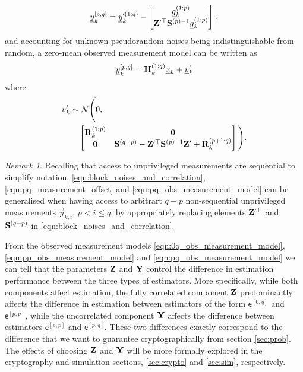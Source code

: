 \documentclass[conference]{IEEEtran}
\theoremstyle{definition}
\theoremstyle{remark}
\newtheorem*{remark}{Remark}
\begin{document}
\begin{LaTeXdescription}
  \begin{equation}\label{eqn:pq_measurement_offset}
    \vec{y}_k^{[p,q]}=\vec{y}_k^{\prime(1:q)} - 
    \begin{bmatrix}
      \vec{g}_k^{(1:p)}\\
      \mat{Z}^{\prime\top}\mat{S}^{(p)-1}\vec{g}_k^{(1:p)}
    \end{bmatrix}\,,
  \end{equation}
  and accounting for unknown pseudorandom noises being indistinguishable from random, a zero-mean observed measurement model can be written as
  \begin{equation}\label{eqn:pq_obs_measurement_model}
    \vec{y}_k^{[p,q]} = \mat{H}_k^{(1:q)}\vec{x}_k + \vec{v}_k^{\prime}
  \end{equation}
  where 
  \begin{equation*}
    \begin{split}
      &{\underline{v}}_k^{\prime} \sim \mathcal{N}\Bigg({\underline{0}},\\
      &\qquad 
      \begin{bmatrix}
        {\ensuremath{{\mathbf{R}}}}_k^{(1:p)} & {{\mathbf{0}}}\\
        {{\mathbf{0}}} & {{\mathbf{S}}}^{(q-p)} - {{\mathbf{Z}}}^{\prime\top}{{\mathbf{S}}}^{(p)-1}{{\mathbf{Z}}}^{\prime} + {{\mathbf{R}}}_k^{(p+1:q)}
      \end{bmatrix}\Bigg).
    \end{split}
  \end{equation*}
\end{LaTeXdescription}
\begin{remark}
  Recalling that access to unprivileged measurements are sequential to simplify notation, \eqref{eqn:block_noises_and_correlation}, \eqref{eqn:pq_measurement_offset} and \eqref{eqn:pq_obs_measurement_model} can be generalised when having access to arbitrart $q-p$ non-sequential unprivileged measurements $\vec{y}_{k,i}$, $p<i\leq q$, by appropriately replacing elements ${{\mathbf{Z}}}^{\prime\top}$ and ${{\mathbf{S}}}^{(q-p)}$ in \eqref{eqn:block_noises_and_correlation}.
\end{remark}

From the observed measurement models \eqref{eqn:0q_obs_measurement_model}, \eqref{eqn:pp_obs_measurement_model} and \eqref{eqn:pq_obs_measurement_model} we can tell that the parameters ${{\mathbf{Z}}}$ and ${{\mathbf{Y}}}$ control the difference in estimation performance between the three types of estimators. More specifically, while both components affect estimation, the fully correlated component ${{\mathbf{Z}}}$ predominantly affects the difference in estimation between estimators of the form $\mathsf{e}^{[0,q]}$ and $\mathsf{e}^{[p,p]}$, while the uncorrelated component ${{\mathbf{Y}}}$ affects the difference between estimators $\mathsf{e}^{[p,p]}$ and $\mathsf{e}^{[p,q]}$. These two differences exactly correspond to the difference that we want to guarantee cryptographically from section \ref{sec:prob}. The effects of choosing ${{\mathbf{Z}}}$ and ${{\mathbf{Y}}}$ will be more formally explored in the cryptography and simulation sections, \ref{sec:crypto} and \ref{sec:sim}, respectively.
\end{document}
